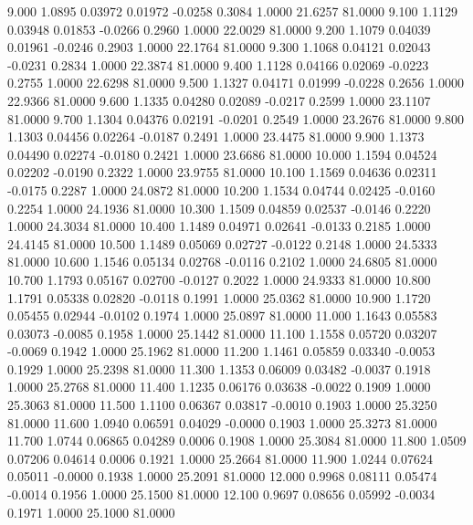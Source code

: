    9.000   1.0895   0.03972   0.01972  -0.0258   0.3084   1.0000  21.6257  81.0000
   9.100   1.1129   0.03948   0.01853  -0.0266   0.2960   1.0000  22.0029  81.0000
   9.200   1.1079   0.04039   0.01961  -0.0246   0.2903   1.0000  22.1764  81.0000
   9.300   1.1068   0.04121   0.02043  -0.0231   0.2834   1.0000  22.3874  81.0000
   9.400   1.1128   0.04166   0.02069  -0.0223   0.2755   1.0000  22.6298  81.0000
   9.500   1.1327   0.04171   0.01999  -0.0228   0.2656   1.0000  22.9366  81.0000
   9.600   1.1335   0.04280   0.02089  -0.0217   0.2599   1.0000  23.1107  81.0000
   9.700   1.1304   0.04376   0.02191  -0.0201   0.2549   1.0000  23.2676  81.0000
   9.800   1.1303   0.04456   0.02264  -0.0187   0.2491   1.0000  23.4475  81.0000
   9.900   1.1373   0.04490   0.02274  -0.0180   0.2421   1.0000  23.6686  81.0000
  10.000   1.1594   0.04524   0.02202  -0.0190   0.2322   1.0000  23.9755  81.0000
  10.100   1.1569   0.04636   0.02311  -0.0175   0.2287   1.0000  24.0872  81.0000
  10.200   1.1534   0.04744   0.02425  -0.0160   0.2254   1.0000  24.1936  81.0000
  10.300   1.1509   0.04859   0.02537  -0.0146   0.2220   1.0000  24.3034  81.0000
  10.400   1.1489   0.04971   0.02641  -0.0133   0.2185   1.0000  24.4145  81.0000
  10.500   1.1489   0.05069   0.02727  -0.0122   0.2148   1.0000  24.5333  81.0000
  10.600   1.1546   0.05134   0.02768  -0.0116   0.2102   1.0000  24.6805  81.0000
  10.700   1.1793   0.05167   0.02700  -0.0127   0.2022   1.0000  24.9333  81.0000
  10.800   1.1791   0.05338   0.02820  -0.0118   0.1991   1.0000  25.0362  81.0000
  10.900   1.1720   0.05455   0.02944  -0.0102   0.1974   1.0000  25.0897  81.0000
  11.000   1.1643   0.05583   0.03073  -0.0085   0.1958   1.0000  25.1442  81.0000
  11.100   1.1558   0.05720   0.03207  -0.0069   0.1942   1.0000  25.1962  81.0000
  11.200   1.1461   0.05859   0.03340  -0.0053   0.1929   1.0000  25.2398  81.0000
  11.300   1.1353   0.06009   0.03482  -0.0037   0.1918   1.0000  25.2768  81.0000
  11.400   1.1235   0.06176   0.03638  -0.0022   0.1909   1.0000  25.3063  81.0000
  11.500   1.1100   0.06367   0.03817  -0.0010   0.1903   1.0000  25.3250  81.0000
  11.600   1.0940   0.06591   0.04029  -0.0000   0.1903   1.0000  25.3273  81.0000
  11.700   1.0744   0.06865   0.04289   0.0006   0.1908   1.0000  25.3084  81.0000
  11.800   1.0509   0.07206   0.04614   0.0006   0.1921   1.0000  25.2664  81.0000
  11.900   1.0244   0.07624   0.05011  -0.0000   0.1938   1.0000  25.2091  81.0000
  12.000   0.9968   0.08111   0.05474  -0.0014   0.1956   1.0000  25.1500  81.0000
  12.100   0.9697   0.08656   0.05992  -0.0034   0.1971   1.0000  25.1000  81.0000
